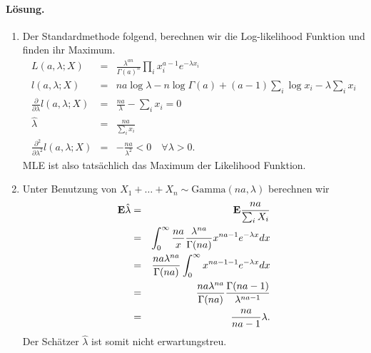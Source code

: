 \paragraph*{Lösung.}
\begin{enumerate}
    \item Der Standardmethode folgend, berechnen wir die Log-likelihood
        Funktion und finden ihr Maximum.
        \begin{eqnarray}
            L(a,\lambda; X) &=& \frac{\lambda^{an}}{\Gamma(a)^n} \prod_i x_i^{ a-1 } e^{-\lambda x_i} \\
            l(a,\lambda; X) &=& na \log \lambda - n \log \Gamma\left( a \right) + 
                                \left( a-1 \right) \sum_{i}^{} \log x_i - \lambda \sum_{i}^{} x_i \\
            \frac{\partial}{\partial \lambda} l(a,\lambda; X) &=&  \frac{na}{\lambda} - \sum_{i}^{} x_i = 0  \\
            \hat \lambda &=& \frac{na}{\sum_{i}^{} x_i} \\
            \frac{\partial^2}{\partial \lambda^2} l(a,\lambda; X) &=& - \frac{na}{ \lambda^2} <0 \quad \forall \lambda>0.
        \end{eqnarray}
        MLE ist also tatsächlich das Maximum der Likelihood Funktion. 
    \item Unter Benutzung von $X_1+ \ldots + X_n \sim \textrm{Gamma}(na,\lambda)$ berechnen wir
        \begin{eqnarray}
            \mathbf{E} \hat \lambda &=& \mathbf{E} \frac{na}{ \sum_{i}^{} X_i }  \\
            &=& \int_{0}^{\infty} \frac{na}{x} \frac{\lambda^{na}}{\Gamma(na)} x^{na-1} e^{-\lambda x} dx \\
            &=& \frac{na \lambda^{na}}{\Gamma(na)} \int_{0}^{\infty} x^{na -1-1} e^{-\lambda x}dx \\
            &=& \frac{na \lambda^{na}}{\Gamma(na)} \frac{\Gamma(na-1)}{\lambda^{na-1}} \\
            &=& \frac{na}{na-1} \lambda.
        \end{eqnarray}
        Der Schätzer $\hat\lambda$ ist somit nicht erwartungstreu.
\end{enumerate}



